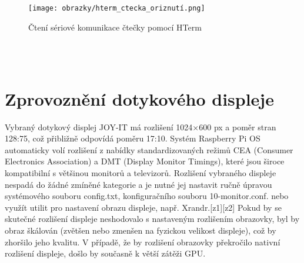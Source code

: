 \begin{figure}[h]
    \begin{center}
        \texttt{[image: obrazky/hterm\_ctecka\_oriznutí.png]}
    \end{center}
    \caption{Čtení sériové komunikace čtečky pomocí HTerm}
    \label{Zprovoznění čtečky}
\end{figure}

\\\\


\section{Zprovoznění dotykového displeje}

Vybraný dotykový displej JOY-IT má rozlišení 1024×600 px a poměr stran 128:75, což přibližně odpovídá poměru 17:10. Systém Raspberry Pi OS automaticky volí rozlišení z nabídky standardizovaných režimů CEA (Consumer Electronics Association) a DMT (Display Monitor Timings), které jsou široce kompatibilní s většinou monitorů a televizorů. Rozlišení vybraného displeje nespadá do žádné zmíněné kategorie a je nutné jej nastavit ručně úpravou systémového souboru config.txt, konfiguračního souboru 10-monitor.conf. nebo využít utilit pro nastavení obrazu displeje, např. Xrandr.[z1][z2]
Pokud by se skutečné rozlišení displeje neshodovalo s nastaveným rozlišením obrazovky, byl by obraz škálován (zvětšen nebo zmenšen na fyzickou velikost displeje), což by zhoršilo jeho kvalitu. V případě, že by rozlišení obrazovky překročilo nativní rozlišení displeje, došlo by současně k větší zátěži GPU.

